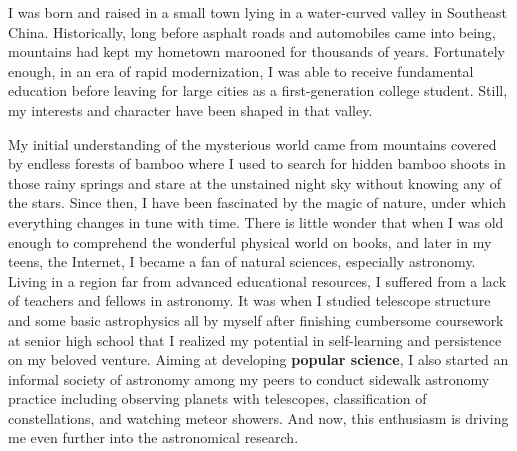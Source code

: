 \documentclass[11pt, a4paper]{awesome-cv} %
\begin{document}
\makecvheader %



\begin{cvletter}

I was born and raised in a small town lying in a water-curved valley in Southeast China. Historically, long before asphalt roads and automobiles came into being, mountains had kept my hometown marooned for thousands of years. Fortunately enough, in an era of rapid modernization, I was able to receive fundamental education before leaving for large cities as a first-generation college student. Still, my interests and character have been shaped in that valley.

My initial understanding of the mysterious world came from mountains covered by endless forests of bamboo where I used to search for hidden bamboo shoots in those rainy springs and stare at the unstained night sky without knowing any of the stars. Since then, I have been fascinated by the magic of nature, under which everything changes in tune with time. There is little wonder that when I was old enough to comprehend the wonderful physical world on books, and later in my teens, the Internet, I became a fan of natural sciences, especially astronomy. Living in a region far from advanced educational resources, I suffered from a lack of teachers and fellows in astronomy. It was when I studied telescope structure and some basic astrophysics all by myself after finishing cumbersome coursework at senior high school that I realized my potential in self-learning and persistence on my beloved venture. Aiming at developing \textbf{popular science}, I also started an informal society of astronomy among my peers to conduct sidewalk astronomy practice including observing planets with telescopes, classification of constellations, and watching meteor showers. And now, this enthusiasm is driving me even further into the astronomical research.


\end{cvletter}
\end{document}
